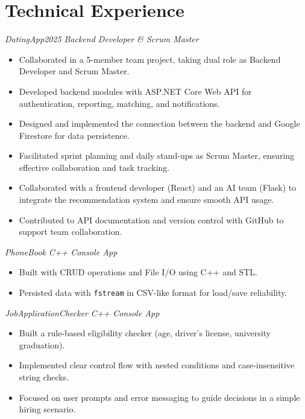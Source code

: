 \documentclass[10pt,a4paper]{extarticle}
\begin{document}
\section{Technical Experience}
\textit{DatingApp2025} \hspace{3cm} \textit{Backend Developer \& Scrum Master}\\
\begin{itemize}[leftmargin=*,noitemsep,topsep=0pt]
    \item Collaborated in a 5-member team project, taking dual role as Backend Developer and Scrum Master.
    \item Developed backend modules with ASP.NET Core Web API for authentication, reporting, matching, and notifications.
    \item Designed and implemented the connection between the backend and Google Firestore for data persistence.
    \item Facilitated sprint planning and daily stand-ups as Scrum Master, ensuring effective collaboration and task tracking.
    \item Collaborated with a frontend developer (React) and an AI team (Flask) to integrate the recommendation system and ensure smooth API usage.
    \item Contributed to API documentation and version control with GitHub to support team collaboration.
\end{itemize}
\vspace{0.5cm} 
\textit{PhoneBook} \hspace{3cm} \textit{C++ Console App}\\
\begin{itemize}[leftmargin=*,noitemsep,topsep=0pt]
    \item Built with CRUD operations and File I/O using C++ and STL.
    \item Persisted data with \texttt{fstream} in CSV-like format for load/save reliability.
\end{itemize}
\vspace{0.5cm} 
\textit{JobApplicationChecker} \hspace{3cm} \textit{C++ Console App}\\
\begin{itemize}[leftmargin=*,noitemsep,topsep=0pt]
    \item Built a rule-based eligibility checker (age, driver’s license, university graduation).
    \item Implemented clear control flow with nested conditions and case-insensitive string checks.
    \item Focused on user prompts and error messaging to guide decisions in a simple hiring scenario.
\end{itemize}
\end{document}
